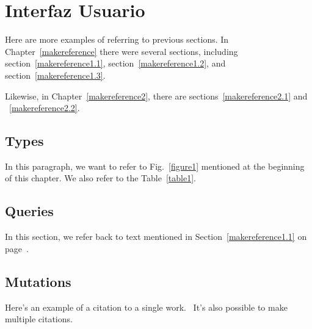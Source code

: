 
\cleardoublepage


\chapter{Interfaz Usuario}
\label{makereference5}

Here are more examples of referring to previous sections.  In
Chapter~\ref{makereference} there were several sections, including
section~\ref{makereference1.1}, section~\ref{makereference1.2},
and section~\ref{makereference1.3}.

Likewise, in Chapter~\ref{makereference2}, there are
sections~\ref{makereference2.1} and ~\ref{makereference2.2}.





\section{Types}
\label{makereference5.1}

In this paragraph, we want to refer to Fig.~\ref{figure1}
mentioned at the beginning of this chapter.  We also refer to the
Table~\ref{table1}.

\section{Queries}
\label{makereference5.2}

In this section, we refer back to text mentioned in
Section~\ref{makereference1.1} on page~\pageref{makereference1.1}.

\section{Mutations}
\label{makereference5.3}

Here's an example of a citation to a single
work.~\citet{CT:Weiner:1999} It's also possible to make multiple
citations.~\citet{CT:Phillips:1985, ARP:Loy:1974}
